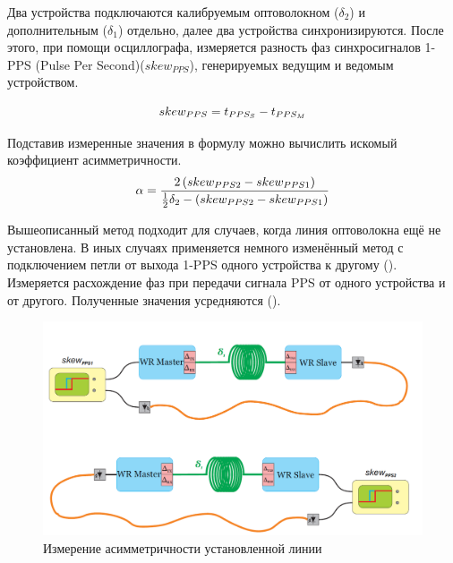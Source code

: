 Два устройства подключаются калибруемым оптоволокном ($\delta_{2}$) и дополнительным ($\delta_{1}$) отдельно, 
далее два устройства синхронизируются. После этого, при помощи осциллографа, измеряется разность фаз синхросигналов 1-PPS
(Pulse Per Second)($ skew_{PPS} $), генерируемых ведущим и ведомым устройством. 

\begin{equation}
	skew_{PPS} = t_{PPS_S} - t_{PPS_M}\\
\end{equation}

Подставив измеренные значения в формулу  можно вычислить искомый коэффициент асимметричности.\\

\begin{equation}
	\label{eq:alpha}
	\alpha = \frac{2 \left( skew_{PPS2} - skew_{PPS1} \right) }{\frac{1}{2} \delta_2 - \left( skew_{PPS2} - skew_{PPS1} \right)}\\
\end{equation}

\bigbreak

Вышеописанный метод подходит для случаев, когда линия оптоволокна ещё не установлена.
В иных случаях применяется немного изменённый метод с подключением петли от выхода 1-PPS одного устройства к другому (). 
Измеряется расхождение фаз при передачи сигнала PPS от одного устройства и от другого. Полученные значения усредняются ().

\begin{figure}[ht!] 
	\center
	\includegraphics [scale=0.4] {my_folder/images//meas_scheme_2}
	\caption{Измерение асимметричности установленной линии} 
	\label{fig:meas-scheme-2}  
\end{figure}

